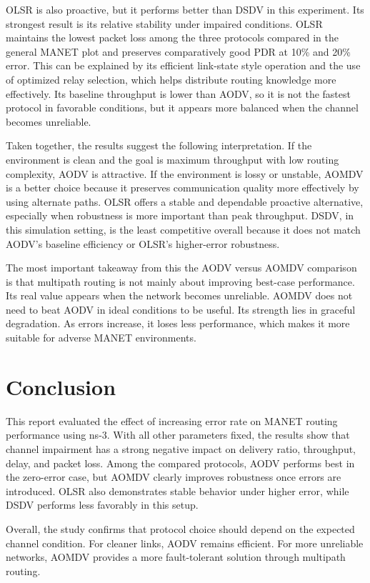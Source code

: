 \documentclass[11pt]{article}
\begin{document}
OLSR is also proactive, but it performs better than DSDV in this experiment. Its strongest result is its relative stability under impaired conditions. OLSR maintains the lowest packet loss among the three protocols compared in the general MANET plot and preserves comparatively good PDR at 10\% and 20\% error. This can be explained by its efficient link-state style operation and the use of optimized relay selection, which helps distribute routing knowledge more effectively. Its baseline throughput is lower than AODV, so it is not the fastest protocol in favorable conditions, but it appears more balanced when the channel becomes unreliable.

Taken together, the results suggest the following interpretation. If the environment is clean and the goal is maximum throughput with low routing complexity, AODV is attractive. If the environment is lossy or unstable, AOMDV is a better choice because it preserves communication quality more effectively by using alternate paths. OLSR offers a stable and dependable proactive alternative, especially when robustness is more important than peak throughput. DSDV, in this simulation setting, is the least competitive overall because it does not match AODV's baseline efficiency or OLSR's higher-error robustness.

The most important takeaway from this the AODV versus AOMDV comparison is that multipath routing is not mainly about improving best-case performance. Its real value appears when the network becomes unreliable. AOMDV does not need to beat AODV in ideal conditions to be useful. Its strength lies in graceful degradation. As errors increase, it loses less performance, which makes it more suitable for adverse MANET environments.

\section{Conclusion}

This report evaluated the effect of increasing error rate on MANET routing performance using ns-3. With all other parameters fixed, the results show that channel impairment has a strong negative impact on delivery ratio, throughput, delay, and packet loss. Among the compared protocols, AODV performs best in the zero-error case, but AOMDV clearly improves robustness once errors are introduced. OLSR also demonstrates stable behavior under higher error, while DSDV performs less favorably in this setup.

Overall, the study confirms that protocol choice should depend on the expected channel condition. For cleaner links, AODV remains efficient. For more unreliable networks, AOMDV provides a more fault-tolerant solution through multipath routing.
\end{document}
